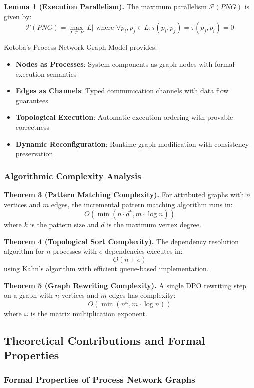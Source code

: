 \documentclass[11pt,a4paper]{article}
\begin{document}
\textbf{Lemma 1 (Execution Parallelism).} The maximum parallelism $\mathcal{P}(PNG)$ is given by:
\[
\mathcal{P}(PNG) = \max_{L \subseteq P} |L| \text{ where } \forall p_i, p_j \in L: \tau(p_i, p_j) = \tau(p_j, p_i) = 0
\]

Kotoba's Process Network Graph Model provides:

\begin{itemize}
\item \textbf{Nodes as Processes}: System components as graph nodes with formal execution semantics
\item \textbf{Edges as Channels}: Typed communication channels with data flow guarantees
\item \textbf{Topological Execution}: Automatic execution ordering with provable correctness
\item \textbf{Dynamic Reconfiguration}: Runtime graph modification with consistency preservation
\end{itemize}

\subsubsection{Algorithmic Complexity Analysis}
\label{subsubsec:complexity}

\textbf{Theorem 3 (Pattern Matching Complexity).} For attributed graphs with $n$ vertices and $m$ edges, the incremental pattern matching algorithm runs in:
\[
O\left(\min\left(n \cdot d^k, m \cdot \log n\right)\right)
\]
where $k$ is the pattern size and $d$ is the maximum vertex degree.

\textbf{Theorem 4 (Topological Sort Complexity).} The dependency resolution algorithm for $n$ processes with $e$ dependencies executes in:
\[
O(n + e)
\]
using Kahn's algorithm with efficient queue-based implementation.

\textbf{Theorem 5 (Graph Rewriting Complexity).} A single DPO rewriting step on a graph with $n$ vertices and $m$ edges has complexity:
\[
O\left(\min\left(n^{\omega}, m \cdot \log n\right)\right)
\]
where $\omega$ is the matrix multiplication exponent.

\subsection{Theoretical Contributions and Formal Properties}
\label{subsec:theoretical_contributions}

\subsubsection{Formal Properties of Process Network Graphs}
\label{subsubsec:formal_properties}
\end{document}
